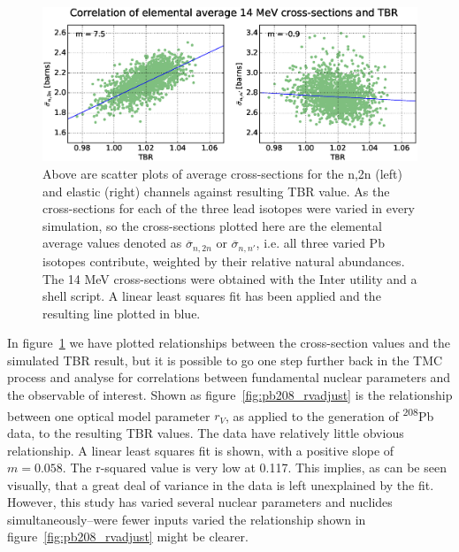 \begin{figure}[H]
  \centering
	\includegraphics[width=\textwidth]{pb_tbr_n2n_el_corr}
	\caption{Above are scatter plots of average cross-sections for the n,2n (left) and elastic (right) channels against resulting TBR value. As the cross-sections for each of the three lead isotopes were varied in every simulation, so the cross-sections plotted here are the elemental average values denoted as $\overline{\sigma}_{n,2n}$ or $\overline{\sigma}_{n,n'}$, i.e. all three varied Pb isotopes contribute, weighted by their relative natural abundances. The 14 MeV cross-sections were obtained with the Inter utility and a shell script. A linear least squares fit has been applied and the resulting line plotted in blue.}
	\label{fig:tbr_n2n}
\end{figure}

In figure~\ref{fig:tbr_n2n} we have plotted relationships between the cross-section values and the simulated TBR result, but it is possible to go one step further back in the TMC process and analyse for correlations between fundamental nuclear parameters and the observable of interest. Shown as figure~\ref{fig:pb208_rvadjust} is the relationship between one optical model parameter $r_{V}$, as applied to the generation of \textsuperscript{208}Pb data, to the resulting TBR values. The data have relatively little obvious relationship. A linear least squares fit is shown, with a positive slope of $m=0.058$. The r-squared value is very low at 0.117. This implies, as can be seen visually, that a great deal of variance in the data is left unexplained by the fit. However, this study has varied several nuclear parameters and nuclides simultaneously--were fewer inputs varied the relationship shown in figure~\ref{fig:pb208_rvadjust} might be clearer. 

